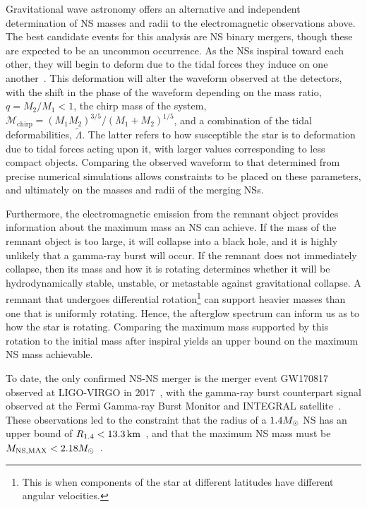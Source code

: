 Gravitational wave astronomy offers an alternative and independent determination of NS masses and radii to the electromagnetic observations above. The best candidate events for this analysis are NS binary mergers, though these are expected to be an uncommon occurrence. As the NSs inspiral toward each other, they will begin to deform due to the tidal forces they induce on one another~\cite{Lattimer:2019eez_jun_NeutronStarMass}. 
This deformation will alter the waveform observed at the detectors, with the shift in the phase of the waveform depending on the mass ratio, $q = M_2/M_1 <1$, the chirp mass of the system, $\mathcal{M}_\mathrm{chirp} = (M_1 M_2)^{3/5}/(M_1 + M_2)^{1/5}$, and a combination of the tidal deformabilities, $\tilde\Lambda$. The latter refers to how susceptible the star is to deformation due to tidal forces acting upon it, with larger values corresponding to less compact objects. Comparing the observed waveform to that determined from precise numerical simulations allows constraints to be placed on these parameters, and ultimately on the masses and radii of the merging NSs.

Furthermore, the electromagnetic emission from the remnant object provides information about the maximum mass an NS can achieve. 
If the mass of the remnant object is too large, it will collapse into a black hole, and it is highly unlikely that a gamma-ray burst will occur. If the remnant does not immediately collapse, then its mass and how it is rotating determines whether it will be hydrodynamically stable, unstable, or metastable against gravitational collapse. A remnant that undergoes differential rotation\footnote{This is when components of the star at different latitudes have different angular velocities.} can support heavier masses than one that is uniformly rotating. Hence, the afterglow spectrum can inform us as to how the star is rotating. Comparing the maximum mass supported by this rotation to the initial mass after inspiral yields an upper bound on the maximum NS mass achievable. 

To date, the only confirmed NS-NS merger is the merger event GW170817 observed at LIGO-VIRGO in 2017~\cite{LIGOScientific:2018cki_oct_GW170817MeasurementsNeutron,LIGOScientific:2018hze_Propertiesbinaryneutron}, with the gamma-ray burst counterpart signal observed at the Fermi Gamma-ray Burst Monitor and INTEGRAL satellite~\cite{LIGOScientific:2017zic_Gravitationalwavesgammarays}. These observations led to the constraint that the radius of a $1.4M_\odot$ NS has an upper bound of $R_{1.4} < 13.3{\rm \,km}$~\cite{LIGOScientific:2018cki_oct_GW170817MeasurementsNeutrona, De:2018uhw_aug_TidalDeformabilitiesRadii}, and that the maximum NS mass must be $M_\mathrm{NS, MAX} < 2.18M_\odot$~\cite{LIGOScientific:2017zic_Gravitationalwavesgammarays}.


